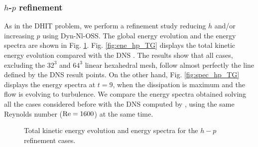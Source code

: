 \subsubsection{$h$-$p$ refinement}

As in the DHIT problem, we perform a refinement study reducing $h$ and/or increasing $p$ using  Dyn-Nl-OSS. 
The global energy evolution and the energy spectra are shown in Fig. \ref{fig:ene_spec_hp_TG}. Fig. \ref{fig:ene_hp_TG} displays the total kinetic energy evolution compared with the DNS \cite{brachet_small-scale_1983}. The results show that all cases, excluding the $32^3$ and $64^3$ linear hexahedral mesh, follow almost perfectly the line defined by the DNS result points. On the other hand, Fig. \ref{fig:spec_hp_TG} displays the energy spectra at $t=9$, when the dissipation is maximum and the flow is evolving to turbulence. We compare the energy spectra obtained solving all the cases considered before with the DNS computed by \cite{gassner_accuracy_????}, using the same Reynolds number (${\rm Re}=1600$) at the same time. 

\begin{figure}[h!]
	\centering
	\caption{Total kinetic energy evolution and energy spectra for the $h-p$ refinement cases.}
	\label{fig:ene_spec_hp_TG}
\end{figure}

